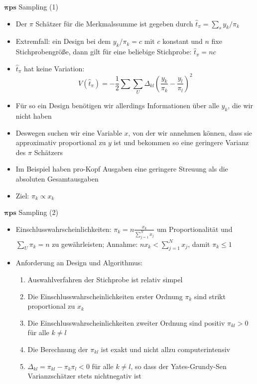 \documentclass[9pt]{beamer}
\begin{document}
\begin{frame}{$\boldsymbol{\pi ps}$ Sampling (1)}
\begin{itemize}
	\item Der $\pi$ Schätzer für die Merkmalssumme ist gegeben durch $\hat{t}_\pi = \sum_s y_k/\pi_k$
	\item Extremfall: ein Design bei dem $y_k/\pi_k=c$ mit $c$ konstant und $n$ fixe Stichprobengröße, dann gilt für eine beliebige Stichprobe: $\hat{t}_\pi=nc$
	\item $\hat{t}_\pi$ hat keine Variation:
	$$V(\hat{t}_\pi)=-\frac{1}{2}\sum\sum_U \Delta_{kl}\left(\frac{y_k}{\pi_k}-\frac{y_l}{\pi_l}\right)^2$$
	\item Für so ein Design benötigen wir allerdings Informationen über alle $y_k$, die wir nicht haben
	\item Deswegen suchen wir eine Variable $x$, von der wir annehmen können, dass sie approximativ proportional zu $y$ ist und bekommen so eine geringere Varianz des $\pi$ Schätzers
	\item Im Beispiel haben pro-Kopf Ausgaben eine geringere Streuung als die absoluten Gesamtausgaben	
\item Ziel: $\pi_k \propto x_k$
	
\end{itemize}
\end{frame}

\begin{frame}{$\boldsymbol{\pi ps}$ Sampling (2)}
\begin{itemize}
	\item  Einschlusswahrscheinlichkeiten: $\pi_k = n \frac{x_k}{\sum_{j=1}^N x_j}$ um Proportionalität und $\sum_U \pi_k =n$ zu gewährleisten; Annahme: $n x_k < \sum_{j=1}^N x_j$, damit $\pi_k \leq 1$
	\item Anforderung an Design und Algorithmus:
	\begin{enumerate}
		\item Auswahlverfahren der Stichprobe ist relativ simpel
		\item Die Einschlusswahrscheinlichkeiten erster Ordnung $\pi_k$ sind strikt proportional zu $x_k$
		\item Die Einschlusswahrscheinlichkeiten zweiter Ordnung sind positiv $\pi_{kl} >0$ für alle $k\neq l$
		\item Die Berechnung der $\pi_{kl}$ ist exakt und nicht allzu computerintensiv		
		\item $\Delta_{kl} = \pi_{kl} - \pi_k \pi_l <0$ für alle $k\neq l$, so dass der Yates-Grundy-Sen Varianzschätzer stets nichtnegativ ist
	\end{enumerate}
\end{itemize}
\end{frame}
\end{document}
